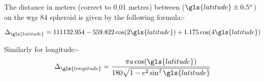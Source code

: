  The distance in meters (correct to 0.01 metres) between ($\gls{latitude} \pm 0.5^o$) on the \gls{wgs} 84 spheroid is given by the following formula:-
 
 \begin{equation}
  \Delta_{\gls{latitude}} =  111132.954 - 559.822\cos(2\gls{latitude}) + 1.175\cos(4\gls{latitude})
 \end{equation}
 
 Similarly  for longitude:-
   \begin{equation}
   \Delta_{\gls{longitude}} = \frac{\pi a \cos(\gls{latitude})}{180\sqrt{1-e^2\sin^2\gls{latitude}}} \label{eq: delta longtitude}
   \end{equation}
